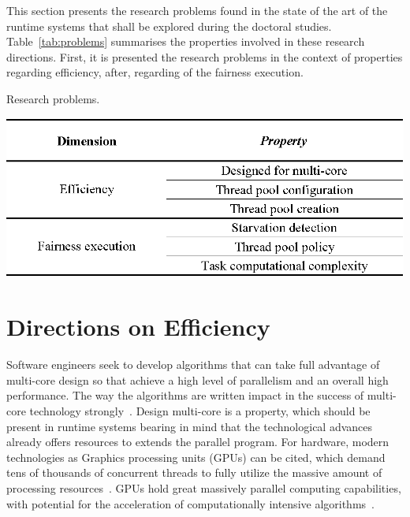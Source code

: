 \label{cap:researchproblems}
\noindent
This section presents the research problems found in the state of the art of the runtime systems that shall be explored during the doctoral studies. Table~\ref{tab:problems} summarises the properties involved in these research directions. First, it is presented the research problems in the context of properties regarding efficiency, after, regarding of the fairness execution.

\begin{table}[hbtp]
	\centering
	\caption{Research problems.}
	\includegraphics[scale=0.9]{./figs/issues.eps}
\label{tab:problems}%
\end{table}%

\section{{Directions on Efficiency}}
\label{sec:directions_efficiency}
Software engineers seek to develop algorithms that can take full advantage of multi-core design so that achieve a high level of parallelism and an overall high performance. The way the algorithms are written impact in the success of multi-core technology strongly~\cite{sethi2015}. Design multi-core is a property, which should be present in runtime systems bearing in mind that the technological advances already offers resources to extends the parallel program. For hardware, modern technologies as Graphics processing units (GPUs) can be cited, which demand tens of thousands of concurrent threads to fully utilize the massive amount of processing resources~\cite{yoon2016}. GPUs hold great massively parallel computing capabilities, with potential for the acceleration of computationally intensive algorithms~\cite{tang2017}. 

